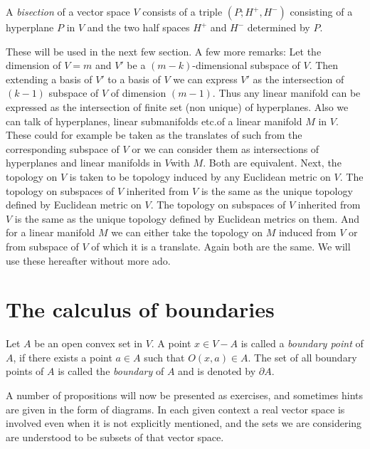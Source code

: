 \begin{definition}\label{chap1-defi1.3.9}
A {\em bisection} of a vector space $V$ consists of a triple $(P;H^{+},H^{-})$ consisting of a hyperplane $P$ in $V$ and the two half spaces $H^{+}$ and $H^{-}$ determined by $P$.
\end{definition}

These will be used in the next few section. A few more remarks: Let the dimension of $V=m$ and $V'$ be a $(m-k)$-dimensional subspace of $V$. Then extending a basis of $V'$ to a basis of $V$ we can express $V'$ as the intersection of $(k-1)$ subspace of $V$ of dimension $(m-1)$. Thus any linear manifold can be expressed as the intersection of finite set (non unique) of hyperplanes. Also we can talk of hyperplanes, linear submanifolds etc.\@ of a linear manifold $M$ in $V$. These could for example be taken as the translates of such from the corresponding subspace of $V$ or we can consider them as intersections of hyperplanes and linear manifolds in $V$\pageoriginale with $M$. Both are equivalent. Next, the topology on $V$ is taken to be topology induced by any Euclidean metric on $V$. The topology on subspaces of $V$ 
inherited from $V$ is the same as the unique topology defined by Euclidean metric on $V$. The topology on subspaces of $V$ inherited from $V$ is the same as the unique topology defined by Euclidean metrics on them. And for a linear manifold $M$ we can either take the topology on $M$ induced from $V$ or from subspace of $V$ of which it is a translate. Again both are the same. We will use these hereafter without more ado.

\section{The calculus of boundaries}\label{chap1-sec1.4}

\begin{definition}\label{chap1-defi1.4.1}
Let $A$ be an open convex set in $V$. A point $x\in V-A$ is called a {\em boundary point} of $A$, if there exists a point $a\in A$ such that $O(x,a)\in A$. The set of all boundary points of $A$ is called the {\em boundary} of $A$ and is denoted by $\partial A$. 
\end{definition}

A number of propositions will now be presented as exercises, and sometimes hints are given in the form of diagrams. In each given context a real vector space is involved even when it is not explicitly mentioned, and the sets we are considering are understood to be subsets of that vector space.

